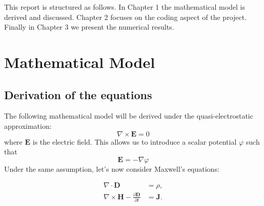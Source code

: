 \documentclass{Configuration_Files/PoliMi3i_thesis}
\let\phi\varphi
\begin{document}
This report is structured as follows. In Chapter 1 the mathematical model is derived and discussed. Chapter 2 focuses on the coding aspect of the project. Finally in Chapter 3 we present the numerical results.


\chapter{Mathematical Model}
\section{Derivation of the equations}
The following mathematical model will be derived under the quasi-electrostatic approximation:
\begin{equation}
    \label{eq: qea}
    \nabla \times \bm{E}=0
\end{equation}
where $\bm{E}$ is the electric field. This allows us to introduce a scalar potential $\phi$ such that
\begin{equation}
    \label{eq: campo}
    \bm{E}=-\nabla  \phi
\end{equation}
Under the same assumption, let's now consider Maxwell's equations:

\begin{subequations}
    \label{eq:maxwell}
    \begin{align}
    \nabla\cdot \bm{D} & = \rho, \label{eq: Gauss} \\
    \nabla \times \bm{H} - \frac{\partial \bm{D}}{\partial t} &= \bm{J}. \label{eq: Max4}
    \end{align}
\end{subequations}
\end{document}

